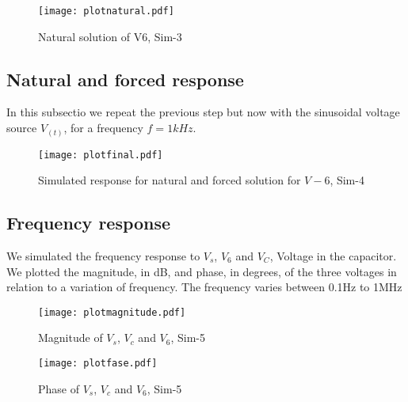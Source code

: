 \FloatBarrier
\begin{figure}[h] \centering
\texttt{[image: plotnatural.pdf]}
\caption{Natural solution of V6, Sim-3}
\label{fig:plotnatural}
\end{figure}
\FloatBarrier

\subsection{Natural and forced response} 

In this subsectio we repeat the previous step but now with the sinusoidal voltage source $V_(t)$, for a frequency $f=1kHz$. 

\FloatBarrier
\begin{figure}[h] \centering
\texttt{[image: plotfinal.pdf]}
\caption{Simulated response for natural and forced solution for $V-6$, Sim-4}
\label{fig:plotfinal}
\end{figure}
\FloatBarrier 

\subsection{Frequency response} 

We simulated the frequency response to $V_s$, $V_6$ and $V_C$, Voltage in the capacitor. We plotted the magnitude, in dB, and phase, in degrees, of the three voltages in relation to a variation of frequency. The frequency varies between 0.1Hz to 1MHz 

\FloatBarrier
\begin{figure}[h] \centering
\texttt{[image: plotmagnitude.pdf]}
\caption{Magnitude of $V_s$, $V_c$ and $V_6$, Sim-5 }
\label{fig:plotmagnitude}
\end{figure}
\FloatBarrier  

\FloatBarrier
\begin{figure}[h] \centering
\texttt{[image: plotfase.pdf]}
\caption{Phase of $V_s$, $V_c$ and $V_6$, Sim-5}
\label{fig:plotfase}
\end{figure}
\FloatBarrier 


%    


